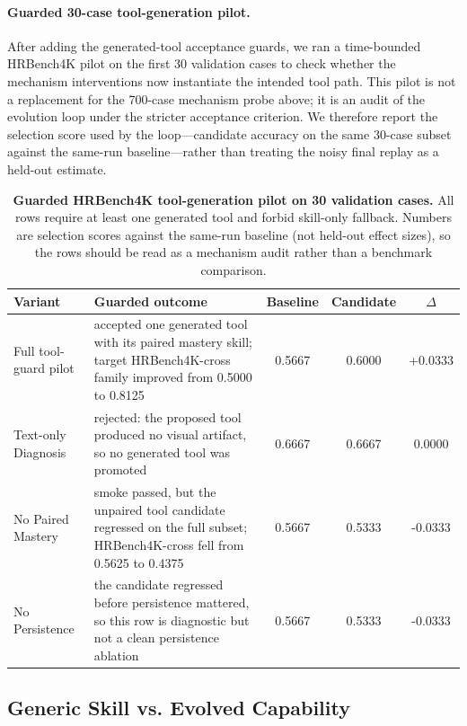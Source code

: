 \paragraph{Guarded 30-case tool-generation pilot.}
After adding the generated-tool acceptance guards, we ran a time-bounded HRBench4K pilot on
the first 30 validation cases to check whether the mechanism interventions now instantiate
the intended tool path. This pilot is not a replacement for the 700-case mechanism probe
above; it is an audit of the evolution loop under the stricter acceptance criterion. We
therefore report the selection score used by the loop---candidate accuracy on the same
30-case subset against the same-run baseline---rather than treating the noisy final replay
as a held-out estimate.

\begin{table}[t]
\centering
\small
\setlength{\tabcolsep}{4pt}
\renewcommand{\arraystretch}{1.15}
\begin{tabular}{lp{}ccc}
\toprule
\textbf{Variant} & \textbf{Guarded outcome}
  & \textbf{Baseline} & \textbf{Candidate} & $\Delta$ \\
\midrule
Full tool-guard pilot & accepted one generated tool with its paired mastery skill;
target HRBench4K-cross family improved from 0.5000 to 0.8125
  & 0.5667 & 0.6000 & +0.0333 \\
Text-only Diagnosis & rejected: the proposed tool produced no visual artifact, so no
generated tool was promoted
  & 0.6667 & 0.6667 & 0.0000 \\
No Paired Mastery & smoke passed, but the unpaired tool candidate regressed on the full
subset; HRBench4K-cross fell from 0.5625 to 0.4375
  & 0.5667 & 0.5333 & -0.0333 \\
No Persistence & the candidate regressed before persistence mattered, so this row is
diagnostic but not a clean persistence ablation
  & 0.5667 & 0.5333 & -0.0333 \\
\bottomrule
\end{tabular}
\caption{%
  \textbf{Guarded HRBench4K tool-generation pilot on 30 validation cases.}
  All rows require at least one generated tool and forbid skill-only fallback. Numbers
  are selection scores against the same-run baseline (not held-out effect sizes), so the
  rows should be read as a mechanism audit rather than a benchmark comparison.
}
\label{tab:ablation_guarded_pilot}
\end{table}

\subsection{Generic Skill vs. Evolved Capability}
\label{app:abl_generic}

